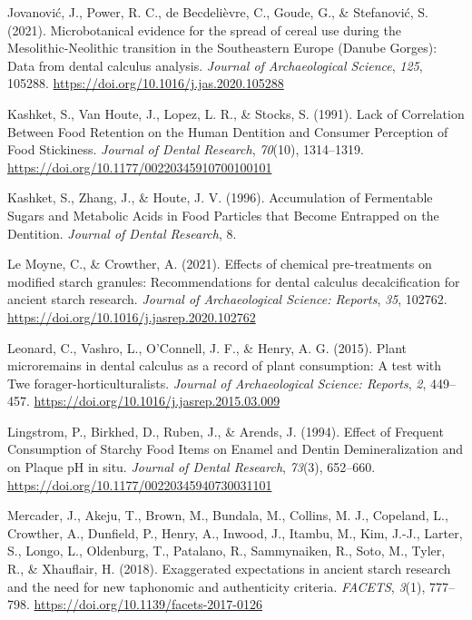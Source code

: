 \documentclass[
  b5paper,
]{book}
\newlength{\cslhangindent}
\newlength{\cslentryspacingunit} %
\newenvironment{CSLReferences}[2] %
 {%
  \setlength{\parindent}{0pt}
  \ifodd #1
  \let\oldpar\par
  \def\par{\hangindent=\cslhangindent\oldpar}
  \fi
  \setlength{\parskip}{#2\cslentryspacingunit}
 }%
 {}
\begin{document}
\begin{CSLReferences}{1}{0}
\leavevmode{}%
Jovanović, J., Power, R. C., de Becdelièvre, C., Goude, G., \&
Stefanović, S. (2021). Microbotanical evidence for the spread of cereal
use during the {Mesolithic-Neolithic} transition in the {Southeastern
Europe} ({Danube Gorges}): {Data} from dental calculus analysis.
\emph{Journal of Archaeological Science}, \emph{125}, 105288.
\url{https://doi.org/10.1016/j.jas.2020.105288}

\leavevmode{}%
Kashket, S., Van Houte, J., Lopez, L. R., \& Stocks, S. (1991). Lack of
{Correlation Between Food Retention} on the {Human Dentition} and
{Consumer Perception} of {Food Stickiness}. \emph{Journal of Dental
Research}, \emph{70}(10), 1314--1319.
\url{https://doi.org/10.1177/00220345910700100101}

\leavevmode{}%
Kashket, S., Zhang, J., \& Houte, J. V. (1996). Accumulation of
{Fermentable Sugars} and {Metabolic Acids} in {Food Particles} that
{Become Entrapped} on the {Dentition}. \emph{Journal of Dental
Research}, 8.

\leavevmode{}%
Le Moyne, C., \& Crowther, A. (2021). Effects of chemical pre-treatments
on modified starch granules: {Recommendations} for dental calculus
decalcification for ancient starch research. \emph{Journal of
Archaeological Science: Reports}, \emph{35}, 102762.
\url{https://doi.org/10.1016/j.jasrep.2020.102762}

\leavevmode{}%
Leonard, C., Vashro, L., O'Connell, J. F., \& Henry, A. G. (2015). Plant
microremains in dental calculus as a record of plant consumption: {A}
test with {Twe} forager-horticulturalists. \emph{Journal of
Archaeological Science: Reports}, \emph{2}, 449--457.
\url{https://doi.org/10.1016/j.jasrep.2015.03.009}

\leavevmode{}%
Lingstrom, P., Birkhed, D., Ruben, J., \& Arends, J. (1994). Effect of
{Frequent Consumption} of {Starchy Food Items} on {Enamel} and {Dentin
Demineralization} and on {Plaque pH} in situ. \emph{Journal of Dental
Research}, \emph{73}(3), 652--660.
\url{https://doi.org/10.1177/00220345940730031101}

\leavevmode{}%
Mercader, J., Akeju, T., Brown, M., Bundala, M., Collins, M. J.,
Copeland, L., Crowther, A., Dunfield, P., Henry, A., Inwood, J., Itambu,
M., Kim, J.-J., Larter, S., Longo, L., Oldenburg, T., Patalano, R.,
Sammynaiken, R., Soto, M., Tyler, R., \& Xhauflair, H. (2018).
Exaggerated expectations in ancient starch research and the need for new
taphonomic and authenticity criteria. \emph{FACETS}, \emph{3}(1),
777--798. \url{https://doi.org/10.1139/facets-2017-0126}


\end{CSLReferences}
\end{document}
